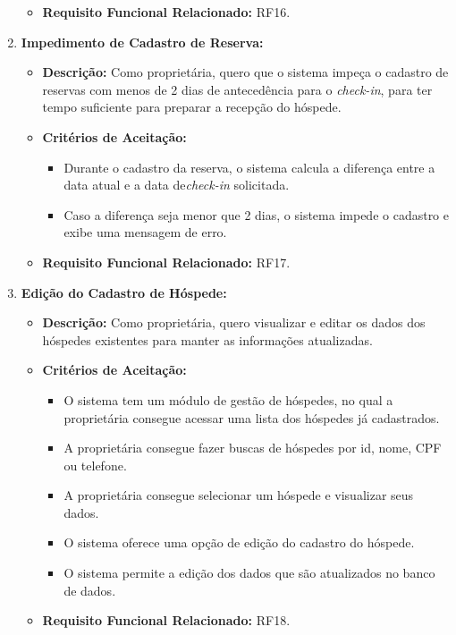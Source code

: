 \documentclass[
	12pt,				%
	openany,			%
	twoside,			%
	a4paper,			%
	english,			%
	french,				%
	spanish,			%
	brazil				%
	]{abntex2}
\begin{document}
\begin{enumerate}[label=\textbf{\arabic*.}]
\begin{itemize}
\begin{itemize}
	 	\end{itemize}
	 	\item \textbf{Requisito Funcional Relacionado:} RF16.
	 \end{itemize} 
	  \item \textbf{Impedimento de Cadastro de Reserva:}
	 \begin{itemize}
	 	\item \textbf{Descrição:} Como proprietária, quero que o sistema impeça o cadastro de reservas com menos de  2 dias de antecedência para o \textit{check-in}, para ter tempo suficiente para preparar a recepção do hóspede.
	 	\item \textbf{Critérios de Aceitação:}
	 	\begin{itemize}
	 		\item Durante o cadastro da reserva, o sistema calcula a diferença entre a data atual e a data de\textit{check-in} solicitada.
	 		\item Caso a diferença seja menor que 2 dias, o sistema impede o cadastro e exibe uma mensagem de erro.
	 	\end{itemize}
	 	\item \textbf{Requisito Funcional Relacionado:} RF17.
	 \end{itemize} 
	  \item \textbf{Edição do Cadastro de Hóspede:}
	 \begin{itemize}
	 	\item \textbf{Descrição:} Como proprietária, quero visualizar e editar os dados dos hóspedes existentes para manter as informações atualizadas.
	 	\item \textbf{Critérios de Aceitação:}
	 	\begin{itemize}
	 		\item O sistema tem um módulo de gestão de hóspedes, no qual a proprietária consegue acessar uma lista dos hóspedes já cadastrados.
	 		\item A proprietária consegue fazer buscas de hóspedes por id, nome, CPF ou telefone.
	 		\item A proprietária consegue selecionar um hóspede e visualizar seus dados.
	 		\item O sistema oferece uma opção de edição do cadastro do hóspede.
	 		\item O sistema permite a edição dos dados que são atualizados no banco de dados.
	 	\end{itemize}
	 	\item \textbf{Requisito Funcional Relacionado:} RF18.

\end{itemize}
\end{enumerate}
\end{document}
